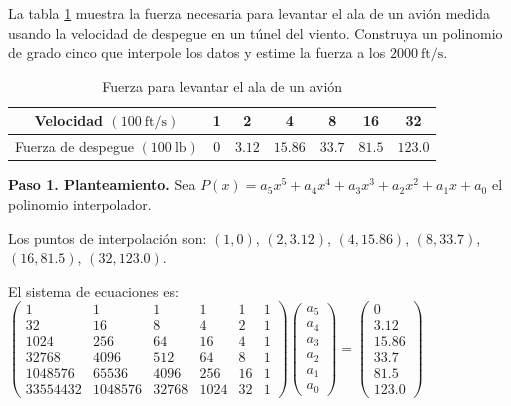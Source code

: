 \begin{prob}
La tabla \ref{Aladeaviontabla} muestra la fuerza necesaria para levantar el ala de un avión medida usando la velocidad de despegue en un túnel del viento. Construya un polinomio de grado cinco que interpole los datos y estime la fuerza a los $2000\ \text{ft}/\text{s}.$

\begin{table}[H]
\centering
\begin{tabular}{|c|c|c|c|c|c|c|}\hline
Velocidad $(100\ \text{ft}/\text{s})$&1&2&4&8&16&32\\\hline
Fuerza de despegue $(100\ \text{lb})$&0&$3.12$&$15.86$&$33.7$&$81.5$&$123.0$\\\hline
\end{tabular}
\caption{Fuerza para levantar el ala de un avión}\label{Aladeaviontabla}
\end{table}

\begin{myproof}
\textbf{Paso 1. Planteamiento.} Sea $P(x) = a_5x^5 + a_4x^4 + a_3x^3 + a_2x^2 + a_1x + a_0$ el polinomio interpolador.

Los puntos de interpolación son: $(1,0)$, $(2,3.12)$, $(4,15.86)$, $(8,33.7)$, $(16,81.5)$, $(32,123.0)$.

El sistema de ecuaciones es:
$\begin{pmatrix}
1 & 1 & 1 & 1 & 1 & 1 \\
32 & 16 & 8 & 4 & 2 & 1 \\
1024 & 256 & 64 & 16 & 4 & 1 \\
32768 & 4096 & 512 & 64 & 8 & 1 \\
1048576 & 65536 & 4096 & 256 & 16 & 1 \\
33554432 & 1048576 & 32768 & 1024 & 32 & 1
\end{pmatrix}
\begin{pmatrix}
a_5 \\ a_4 \\ a_3 \\ a_2 \\ a_1 \\ a_0
\end{pmatrix} = 
\begin{pmatrix}
0 \\ 3.12 \\ 15.86 \\ 33.7 \\ 81.5 \\ 123.0
\end{pmatrix}$


\end{myproof}
\end{prob}
